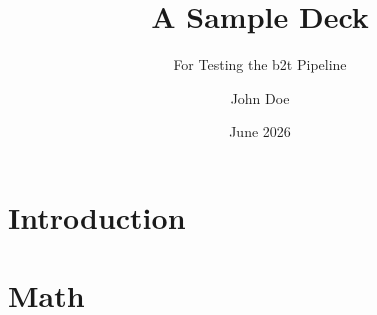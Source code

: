 \documentclass[aspectratio=169]{beamer}
\title{A Sample Deck}
\subtitle{For Testing the b2t Pipeline}
\author{John Doe}
\institute{MIT}
\date{June 2026}
\begin{document}
\begin{frame}
  \titlepage
\end{frame}

\begin{frame}
  \tableofcontents
\end{frame}


\section{Introduction}


\section{Math}




\appendix

\end{document}
